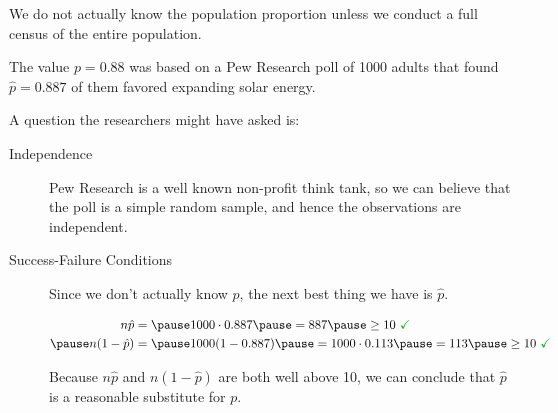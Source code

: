 \documentclass{beamer}
\begin{document}
\begin{frame}
  \begin{examplecont}
    We do not actually know the population proportion unless we conduct a full census of the entire population.\pause

    \vspace{1mm}
    The value $p=0.88$ was based on a Pew Research poll of 1000 adults that found $\hat{p}=0.887$ of them favored expanding solar energy.\pause

    \vspace{1mm}
    A question the researchers might have asked is:

    \vspace{-3mm}
    \begin{center}\small
    \end{center}\pause

    \vspace{-4mm}
    \begin{description}
    \item[Independence] Pew Research is a well known non-profit think tank, so we can believe that the poll is a simple random sample, and hence the observations are independent.\pause
    \item[Success-Failure Conditions] Since we don't actually know $p$, the next best thing we have is $\hat{p}$.

      \vspace{-6.5mm}
      \begin{equation*}
        \begin{aligned}
          n\hat{p} &= \pause
          1000\cdot 0.887\pause
          =887\pause
          \geq 10~{\color{green!70!black}\checkmark} \\\pause
          n(1-\hat{p}) &=\pause
          1000(1-0.887)\pause
          = 1000\cdot 0.113 \pause
          = 113\pause
          \geq 10~{\color{green!70!black}\checkmark}
        \end{aligned}
      \end{equation*}\pause

      \vspace{-4.5mm}
      Because $n\hat{p}$ and $n(1-\hat{p})$ are both well above 10, we can conclude that $\hat{p}$ is a reasonable substitute for $p$.
    \end{description}
  \end{examplecont}
\end{frame}
\end{document}
